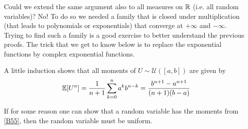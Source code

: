 Could we extend the same argument also to all measures on $\mathbb{R}$ (i.e. all random variables)? No! To do so we needed a family that is closed under multiplication (that leads to polynomials or exponentials) that converge at $+\infty$ and $-\infty$. Trying to find such a family is a good exercise to better understand the previous proofs. The trick that we get to know below is to replace the exponential functions by complex exponential functions.\smallskip

\begin{luebung}
	A little induction shows that all moments of $U\sim \mathcal U([a,b])$ are given by 
	\begin{align}\label{momuniform}
		\mathbb{E}[U^n]=\frac{1}{n+1}\sum_{k=0}^na^kb^{n-k}=\frac{b^{n+1}-a^{n+1}}{(n+1)(b-a)}	
	\end{align}
\end{luebung}
If for some reason one can show that a random variable has the moments from \eqref{B55}, then the random variable must be uniform. \smallskip

